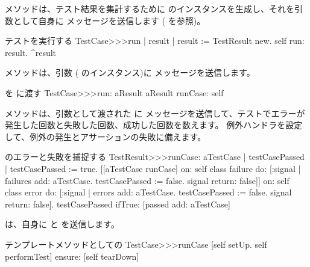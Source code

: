 \documentclass[a4paper,10pt,twoside]{book}
\begin{document}
 メソッドは、テスト結果を集計するために  のインスタンスを生成し、それを引数として自身に  メッセージを送信します
( を参照)。

\begin{method}[tastecaserun]{テストを実行する}
TestCase>>>run
	| result |
	result := TestResult new.
	self run: result.
	^result
\end{method}


 メソッドは、引数 ( のインスタンス)に  メッセージを送信します。

\begin{method}[testcaserun:]{ を  に渡す}
TestCase>>>run: aResult
	aResult runCase: self
\end{method}
 メソッドは、引数として渡された  に  メッセージを送信して、テストでエラーが発生した回数と失敗した回数、成功した回数を数えます。
例外ハンドラを設定して、例外の発生とアサーションの失敗に備えます。
\begin{method}[testresultruncase]{ のエラーと失敗を捕捉する}
TestResult>>>runCase: aTestCase
	| testCasePassed |
	testCasePassed := true.
	[[aTestCase runCase] 
			on: self class failure
			do: 
				[:signal | 
				failures add: aTestCase.
				testCasePassed := false.
				signal return: false]]
					on: self class error
					do:
						[:signal |
						errors add: aTestCase.
						testCasePassed := false.
						signal return: false].
	testCasePassed ifTrue: [passed add: aTestCase]
\end{method}

 は、自身に  と  を送信します。
\begin{method}[testcaseruncase]{テンプレートメソッドとしての \protect\footnotemark}
TestCase>>>runCase
	[self setUp.
	self performTest] ensure: [self tearDown]
\end{method}
\end{document}
